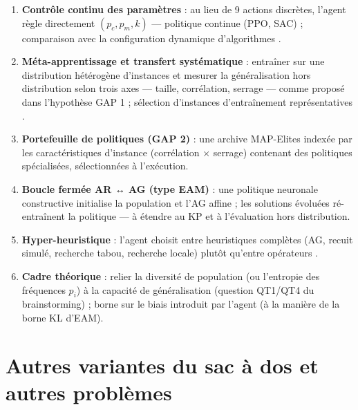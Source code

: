 \documentclass[
  french,
  11pt,
  a4paper,
]{article}
\providecommand{\tightlist}{%
  \setlength{\itemsep}{0pt}\setlength{\parskip}{0pt}}
\begin{document}
\begin{enumerate}
\def\labelenumi{\arabic{enumi}.}
\tightlist
\item
  \textbf{Contrôle continu des paramètres} : au lieu de 9 actions
  discrètes, l'agent règle directement \((p_c, p_m, k)\) --- politique
  continue (PPO, SAC) ; comparaison avec la configuration dynamique
  d'algorithmes \autocite{biedenkapp_2020}.
\item
  \textbf{Méta-apprentissage et transfert systématique} : entraîner sur
  une distribution hétérogène d'instances et mesurer la généralisation
  hors distribution selon trois axes --- taille, corrélation, serrage
  --- comme proposé dans l'hypothèse GAP 1 ; sélection d'instances
  d'entraînement représentatives \autocite{benjamins_2024}.
\item
  \textbf{Portefeuille de politiques (GAP 2)} : une archive MAP-Elites
  \autocite{mouret_clune_2015} indexée par les caractéristiques
  d'instance (corrélation × serrage) contenant des politiques
  spécialisées, sélectionnées à l'exécution.
\item
  \textbf{Boucle fermée AR ↔ AG (type EAM)} : une politique neuronale
  constructive initialise la population et l'AG affine ; les solutions
  évoluées ré-entraînent la politique \autocite{gu_eam_2025} --- à
  étendre au KP et à l'évaluation hors distribution.
\item
  \textbf{Hyper-heuristique} : l'agent choisit entre heuristiques
  complètes (AG, recuit simulé, recherche tabou, recherche locale)
  plutôt qu'entre opérateurs
  \autocite{kallestad_general_2023,dokeroglu_hyper-heuristics_2024}.
\item
  \textbf{Cadre théorique} : relier la diversité de population (ou
  l'entropie des fréquences \(p_i\)) à la capacité de généralisation
  (question QT1/QT4 du brainstorming) ; borne sur le biais introduit par
  l'agent (à la manière de la borne KL d'EAM).
\end{enumerate}

\section{Autres variantes du sac à dos et autres
problèmes}\label{perspectives-autres-variantes-du-sac-uxe0-dos-et-autres-probluxe8mes}
\end{document}
